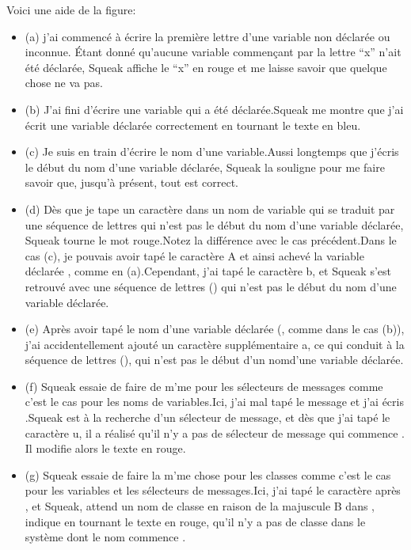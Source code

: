 \documentclass[a4paper,10pt,twoside]{book}
\begin{document}
Voici une aide de la figure:

\begin{itemize}
\item (a) j'ai commenc\'e \`a \'ecrire la premi\`ere lettre d'une variable non d\'eclar\'ee ou inconnue. \'Etant donn\'e qu'aucune variable commen\c cant par la lettre ``x'' n'ait \'et\'e d\'eclar\'ee, Squeak affiche le ``x'' en rouge et me laisse savoir que quelque chose ne va pas.

\item (b) J'ai fini d'\'ecrire une variable qui a \'et\'e d\'eclar\'ee.Squeak me montre que j'ai \'ecrit une variable d\'eclar\'ee correctement en tournant le texte en bleu.

\item (c) Je suis en train d'\'ecrire le nom d'une variable.Aussi longtemps que j'\'ecris le d\'ebut du nom d'une variable d\'eclar\'ee, Squeak la souligne pour me faire savoir que, jusqu'\`a pr\'esent, tout est correct.

\item (d) D\`es que je tape un caract\`ere dans un nom de variable qui se traduit par une s\'equence de lettres qui n'est pas le d\'ebut du nom d'une variable d\'eclar\'ee, Squeak tourne le mot rouge.Notez la diff\'erence avec le cas pr\'ec\'edent.Dans le cas (c), je pouvais avoir tap\'e le caract\`ere A et ainsi achev\'e la variable d\'eclar\'ee , comme en (a).Cependant, j'ai tap\'e le caract\`ere b, et Squeak s'est retrouv\'e avec une s\'equence de lettres () qui n'est pas le d\'ebut du nom d'une variable d\'eclar\'ee.

\item (e) Apr\`es avoir tap\'e le nom d'une variable d\'eclar\'ee (, comme dans le cas (b)), j'ai accidentellement ajout\'e un caract\`ere suppl\'ementaire a, ce qui conduit \`a la s\'equence de lettres (), qui n'est pas le d\'ebut d'un nomd'une variable d\'eclar\'ee.

\item (f) Squeak essaie de faire de m'me pour les s\'electeurs de messages comme c'est le cas pour les noms de variables.Ici, j'ai mal tap\'e le message  et j'ai \'ecris .Squeak est \`a la recherche d'un s\'electeur  de message, et d\`es que j'ai tap\'e le caract\`ere u, il a r\'ealis\'e qu'il n'y a pas de s\'electeur de message qui commence . Il modifie alors le texte en rouge.

\item (g) Squeak essaie de faire la m'me chose pour les classes comme c'est le cas pour les variables et les s\'electeurs de messages.Ici, j'ai tap\'e le caract\`ere  apr\`es , et Squeak, attend un nom de classe en raison de la  majuscule B dans , indique en tournant le texte en rouge, qu'il n'y a pas de classe dans le syst\`eme dont le nom commence .

\end{itemize}
\end{document}
